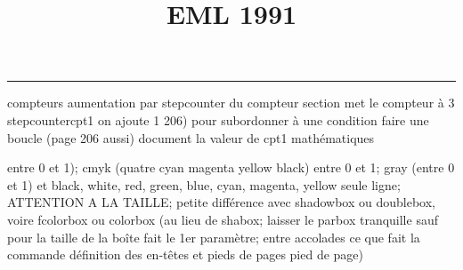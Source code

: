 \documentclass[11pt]{article}%
\title{\bf \vspace{-2cm} EML 1991} %
\author{} %
\date{} %
\renewcommand{\headrulewidth}{0pt}%
\renewcommand{\footrulewidth}{0.4pt}%
\begin{document}
\maketitle %
\vspace{-1.4cm}\hrule %
\thispagestyle{fancy}

\vspace*{.2cm}



compteurs%
aumentation par stepcounter du compteur section%
met le compteur à 3%
stepcounter{cpt1} on ajoute 1%
206) pour subordonner à une condition %
faire une boucle (page 206 aussi) %
document la valeur de cpt1 
mathématiques\newcommand{\ch}{\operatorname{ch}} 
\newcommand{\sh}{\operatorname{sh}}
\renewcommand{\tanh}{\operatorname{th}}
\renewcommand{\sinh}{\operatorname{sh}}
\renewcommand{\cosh}{\operatorname{ch}}
\newcommand{\argsh}{\operatorname{argsh}}
\newcommand{\argch}{\operatorname{argch}}
\newcommand{\argth}{\operatorname{argth}}
\newcommand{\ker}{\operatorname{Ker}}
\renewcommand{\im}{\operatorname{Im}}
\newcommand{\rg}{\operatorname{rg}}
\newcommand{\Id}{\operatorname{Id}}
\newcommand{\id}{\operatorname{id}}
\renewcommand{\leq}{\leq}
\renewcommand{\geq}{\geq }

entre 0 et 1); cmyk (quatre cyan magenta yellow black) entre 0 et 1;
gray (entre 0 et 1) et black, white, red, green, blue, cyan, magenta,
yellow%
seule ligne; ATTENTION A LA TAILLE; petite différence avec shadowbox ou
doublebox, voire fcolorbox ou colorbox (au lieu de shabox; laisser le
parbox tranquille sauf pour la taille de la boîte
\newcommand{\Tbox}[1]{\begin{center} \shabox{\parbox{0.6
\linewidth}{#1}} \end{center}} %
fait le 1er paramètre; entre accolades ce que fait la commande
définition des en-têtes et pieds de pages\pagestyle{fancy}
\chead{}
\rfoot[ \ \thepage]{\thepage}
\cfoot{}
\lfoot{}
\thispagestyle{fancy} %
pied de page)\renewcommand{\footrulewidth}{0.4pt}
\renewcommand{\headrulewidth}{0.4pt}
\end{document}
